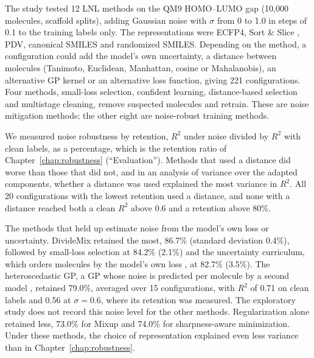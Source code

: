 The study tested 12 LNL methods on the QM9 HOMO--LUMO gap (10,000 molecules, scaffold splits), adding Gaussian noise with $\sigma$ from 0 to 1.0 in steps of 0.1 to the training labels only. The representations were ECFP4, Sort \& Slice \citep{sns}, PDV, canonical SMILES and randomized SMILES. Depending on the method, a configuration could add the model's own uncertainty, a distance between molecules (Tanimoto, Euclidean, Manhattan, cosine or Mahalanobis), an alternative GP kernel or an alternative loss function, giving 221 configurations. Four methods, small-loss selection, confident learning, distance-based selection and multistage cleaning, remove suspected molecules and retrain. These are noise mitigation methods; the other eight are noise-robust training methods.

We measured noise robustness by retention, $R^2$ under noise divided by $R^2$ with clean labels, as a percentage, which is the retention ratio of Chapter~\ref{chap:robustness} (``Evaluation''). Methods that used a distance did worse than those that did not, and in an analysis of variance over the adapted components, whether a distance was used explained the most variance in $R^2$. All 20 configurations with the lowest retention used a distance, and none with a distance reached both a clean $R^2$ above 0.6 and a retention above 80\%.

The methods that held up estimate noise from the model's own loss or uncertainty. DivideMix \citep{li2020dividemix} retained the most, 86.7\% (standard deviation 0.4\%), followed by small-loss selection \citep{Han2018} at 84.2\% (2.1\%) and the uncertainty curriculum, which orders molecules by the model's own loss \citep{Bengio2009, kumar2010selfpaced}, at 82.7\% (3.5\%). The heteroscedastic GP, a GP whose noise is predicted per molecule by a second model \citep{kersting2007most}, retained 79.0\%, averaged over 15 configurations, with $R^2$ of 0.71 on clean labels and 0.56 at $\sigma = 0.6$, where its retention was measured. The exploratory study does not record this noise level for the other methods. Regularization alone retained less, 73.0\% for Mixup and 74.0\% for sharpness-aware minimization. Under these methods, the choice of representation explained even less variance than in Chapter~\ref{chap:robustness}.

